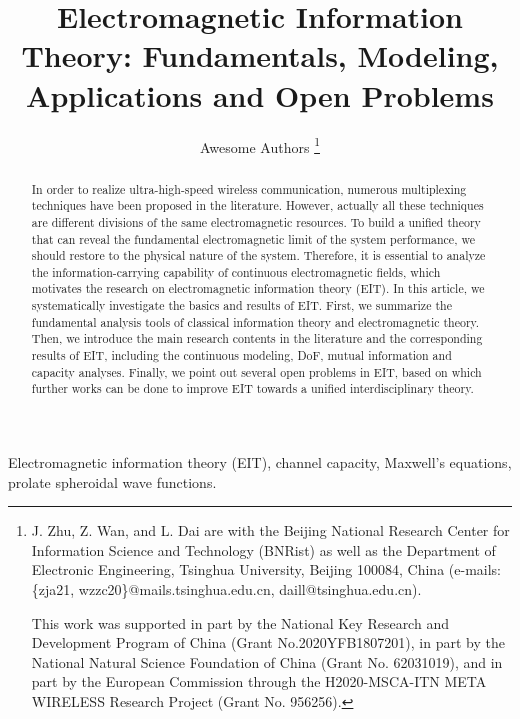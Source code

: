 \documentclass[journal,twocolumn]{IEEEtran}
\begin{document}
\title{Electromagnetic Information Theory: Fundamentals, Modeling, Applications and Open Problems}

\author{{Awesome Authors}
\thanks{J. Zhu, Z. Wan, and L. Dai are with the Beijing National Research Center for Information Science and Technology (BNRist) as well as the Department of Electronic Engineering, Tsinghua University, Beijing 100084, China (e-mails: \{zja21, wzzc20\}@mails.tsinghua.edu.cn, daill@tsinghua.edu.cn).

This work was supported in part by the National Key Research and Development Program of China (Grant No.2020YFB1807201), in part by the National Natural Science Foundation of China (Grant No. 62031019), and in part by the European Commission through the H2020-MSCA-ITN META WIRELESS Research Project (Grant No. 956256).}
}

\maketitle

\begin{abstract}
   In order to realize ultra-high-speed wireless communication, numerous multiplexing techniques have been proposed in the literature. However, actually all these techniques are different divisions of the same electromagnetic resources. To build a unified theory that can reveal the fundamental electromagnetic limit of the system performance, we should restore to the physical nature of the system. Therefore, it is essential to analyze the information-carrying capability of continuous electromagnetic fields, which motivates the research on electromagnetic information theory (EIT). In this article, we systematically investigate the basics and results of EIT. First, we summarize the fundamental analysis tools of classical information theory and electromagnetic theory. Then, we introduce the main research contents in the literature and the corresponding results of EIT, including the continuous modeling, DoF, mutual information and capacity analyses. Finally, we point out several open problems in EIT, based on which further works can be done to improve EIT towards a unified interdisciplinary theory.
\end{abstract}

\begin{IEEEkeywords}
    Electromagnetic information theory (EIT), channel capacity, Maxwell's equations, prolate spheroidal wave functions. 
\end{IEEEkeywords}
\end{document}
